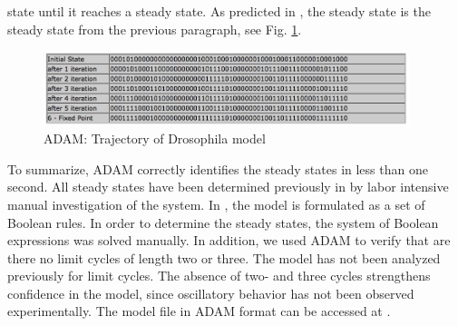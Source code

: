 \documentclass[11pt]{amsart}
\begin{document}
state until it reaches a steady state. As predicted in \cite{AO}, the
steady state is the steady state from the previous paragraph, see Fig.
\ref{fig:traj}.
\begin{figure}[htb]
\centering
\includegraphics[width=0.95\textwidth]{DroTraj.jpg}
\caption{ADAM: Trajectory of Drosophila model}
\label{fig:traj}
\end{figure}
To summarize, ADAM correctly identifies the steady states
in less than one second. All steady states have been determined previously in \cite{AO} by labor intensive manual investigation of the system. In \cite{AO}, the model is formulated as a set of Boolean rules. In order to determine the steady states, the system of Boolean expressions was solved manually.
In addition, we used ADAM to verify that are there no limit
cycles of length two or three. The model has not been analyzed previously for
limit cycles. The absence of two- and three cycles strengthens confidence in
the model, since oscillatory behavior has not been observed experimentally.
The model file in ADAM format can be accessed at \cite{DrosophilaModel}.
\end{document}
